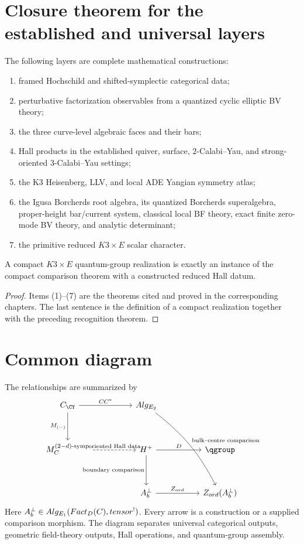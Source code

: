 \chapter{Closure theorem for the established and universal layers}
\begin{theorem}
The following layers are complete mathematical constructions:
\begin{enumerate}
\item framed Hochschild and shifted-symplectic categorical data;
\item perturbative factorization observables from a quantized cyclic elliptic BV theory;
\item the three curve-level algebraic faces and their bars;
\item Hall products in the established quiver, surface, $2$-Calabi--Yau, and strong-oriented $3$-Calabi--Yau settings;
\item the K3 Heisenberg, LLV, and local ADE Yangian symmetry atlas;
\item the Igusa Borcherds root algebra, its quantized Borcherds superalgebra, proper-height bar/current system, classical local BF theory, exact finite zero-mode BV theory, and analytic determinant;
\item the primitive reduced $K3\times E$ scalar character.
\end{enumerate}
A compact $K3\times E$ quantum-group realization is exactly an instance of the compact comparison theorem with a constructed reduced Hall datum.
\end{theorem}
\begin{proof}
Items (1)--(7) are the theorems cited and proved in the corresponding chapters.  The last sentence is the definition of a compact realization together with the preceding recognition theorem.
\end{proof}

\chapter{Common diagram}
The relationships are summarized by
\[
\begin{tikzcd}[column sep=4.8em,row sep=3.4em]
\Ccal_{\CY}
 \arrow[r,"CC^*"]
 \arrow[d,"\M_{(-)}"']&
\Alg_{\Etwo}
 \arrow[ddr,bend left=12,"\text{bulk--centre comparison}"]&{}\\
\M_{\Ccal}^{(2-d)\text{-symp}}
 \arrow[r,dashed,"\text{oriented Hall data}"]&
H^+
 \arrow[r,"\widehat D"]
 \arrow[d,"\text{boundary comparison}"']&
\qgroup\\
{}&A_b^\perp
 \arrow[r,"Z_{\ord}"]&
Z_{\ord}(A_b^\perp)
\end{tikzcd}
\]
Here $A_b^\perp\in Alg_{E_1}(Fact_D(C),tensor^!)$.  Every arrow is a construction or a supplied comparison morphism. The diagram separates universal categorical outputs, geometric field-theory outputs, Hall operations, and quantum-group assembly.

